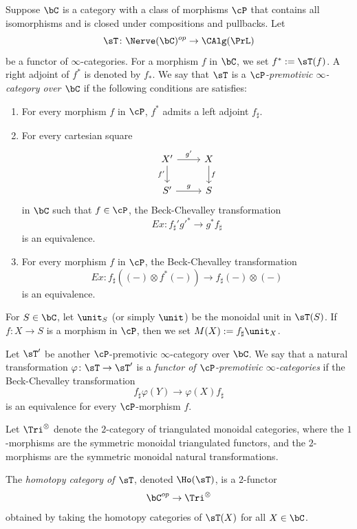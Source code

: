 \documentclass[10pt]{amsart}
\begin{document}
\begin{df}
\label{shv.7}
Suppose $\bC$ is a category with a class of morphisms $\cP$ that contains all isomorphisms and is closed under compositions and pullbacks.
Let
\[
\sT
\colon
\Nerve(\bC)^{op}
\to
\CAlg(\PrL)
\]
be a functor of $\infty$-categories.
For a morphism $f$ in $\bC$, we set $f^*:=\sT(f)$.
A right adjoint of $f^*$ is denoted by $f_*$.
We say that $\sT$ is a \emph{$\cP$-premotivic $\infty$-category over $\bC$} if the following conditions are satisfies:
\begin{enumerate}
\item[(i)]
For every morphism $f$ in $\cP$, $f^*$ admits a left adjoint $f_\sharp$.
\item[(ii)]
For every cartesian square
\[
\begin{tikzcd}
X'\ar[r,"g'"]\ar[d,"f'"']&
X\ar[d,"f"]
\\
S'\ar[r,"g"]&
S
\end{tikzcd}
\]
in $\bC$ such that $f\in \cP$, the Beck-Chevalley transformation
\[
Ex\colon f_\sharp' g'^* \to g^*f_\sharp
\]
is an equivalence.
\item[(iii)] For every morphism $f$ in $\cP$, the Beck-Chevalley transformation
\[
Ex\colon
f_\sharp((-)\otimes f^*(-))
\to
f_\sharp (-) \otimes (-)
\]
is an equivalence.
\end{enumerate}
For $S\in \bC$, let $\unit_S$ (or simply $\unit$) be the monoidal unit in $\sT(S)$.
If $f\colon X\to S$ is a morphism in $\cP$, then we set $M(X):=f_\sharp \unit_X$.

Let $\sT'$ be another $\cP$-premotivic $\infty$-category over $\bC$.
We say that a natural transformation $\varphi\colon \sT\to \sT'$ is a \emph{functor of $\cP$-premotivic $\infty$-categories} if the Beck-Chevalley transformation
\[
f_\sharp \varphi(Y)
\to
\varphi(X) f_\sharp
\]
is an equivalence for every $\cP$-morphism $f$.

Let $\Tri^{\otimes}$ denote the $2$-category of triangulated monoidal categories, where the $1$-morphisms are the symmetric monoidal triangulated functors, and the $2$-morphisms are the symmetric monoidal natural transformations.

The \emph{homotopy category of $\sT$}, denoted $\Ho(\sT)$, is a $2$-functor 
\[
\bC^{op}
\to
\Tri^{\otimes}
\]
obtained by taking the homotopy categories of $\sT(X)$ for all $X\in \bC$.
\end{df}
\end{document}
